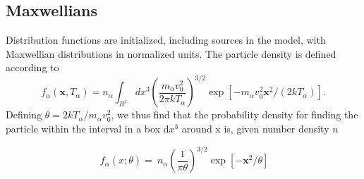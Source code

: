 \documentclass[12pt]{siamart}
\begin{document}
\subsection{Maxwellians}
Distribution functions are initialized, including sources in the model, with Maxwellian distributions in normalized units.
The particle density is defined according to 
$$ f_\alpha\left ( {\bm x}, T_\alpha \right ) = n_\alpha \int_{R^3} dx^3 \left(\frac{m_\alpha v_0^2}{2\pi kT_\alpha}\right)^{3/2}\exp [- m_\alpha v_0^2{\bm x}^2/(2kT_\alpha)] .$$
Defining $\theta=2kT_\alpha/m_\alpha v_0^2$, we thus find that the probability density 
 for finding the particle within the interval in a box d$x^3$ around x is, given number density $n$ 
 
 \begin{equation*}
\label{eq:maxwellian}
  \  f_\alpha \left (x;\theta \right )= \ n_\alpha\left(\frac{1}{\pi\theta}\right)^{3/2} \exp [ -{\bm x}^2/\theta ]
\end{equation*}
\end{document}
